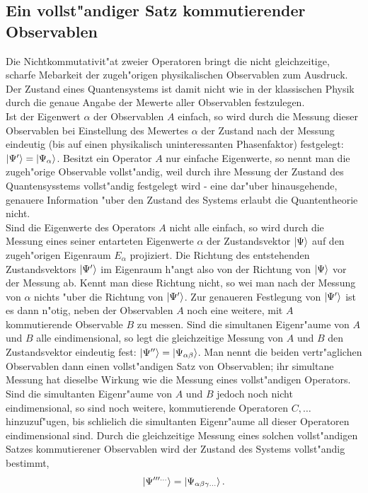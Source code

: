      \subsection{Ein vollst"andiger Satz kommutierender Observablen}
         Die Nichtkommutativit"at zweier Operatoren bringt die nicht gleichzeitige, scharfe Me\3barkeit der zugeh"origen physikalischen Observablen zum Ausdruck. Der
         Zustand eines Quantensystems ist damit nicht wie in der klassischen Physik durch die genaue Angabe der Me\3werte aller Observablen festzulegen. \\
         Ist der Eigenwert $\alpha$ der Observablen $A$ einfach, so wird durch die Messung dieser Observablen bei Einstellung des Me\3wertes $\alpha$ der 
         Zustand nach der Messung eindeutig (bis auf einen physikalisch uninteressanten Phasenfaktor) festgelegt: $\left| \Psi' \right> = \left| \Psi_{\alpha} \right>$. Besitzt ein 
         Operator $A$ nur einfache 
         Eigenwerte, so nennt man die zugeh"orige Observable vollst"andig, weil durch ihre Messung der Zustand des Quantensysstems vollst"andig festgelegt wird - 
         eine dar"uber hinausgehende, genauere Information "uber den Zustand des Systems erlaubt die Quantentheorie nicht. \\
         Sind die Eigenwerte des Operators $A$ nicht alle einfach, so wird durch die Messung eines seiner entarteten Eigenwerte $\alpha$ der Zustandsvektor
         $\left| \Psi \right>$ auf den zugeh"origen Eigenraum $E_{\alpha}$ projiziert. Die Richtung des entstehenden Zustandsvektors $\left| \Psi' \right>$ im Eigenraum h"angt also
         von der Richtung von $\left| \Psi \right>$ vor der Messung ab. Kennt man diese Richtung nicht, so wei\3 man nach der Messung von $\alpha$ nichts "uber die Richtung
         von $\left| \Psi' \right>$. Zur genaueren Festlegung von $\left| \Psi' \right>$ ist es dann n"otig, neben der Observablen $A$ noch
         eine weitere, mit $A$ kommutierende Observable $B$ zu messen. Sind die simultanen Eigenr"aume von $A$ und $B$ alle eindimensional, so legt die gleichzeitige
         Messung von $A$ und $B$ den Zustandsvektor eindeutig fest: $\left| \Psi'' \right> = \left| \Psi_{\alpha\beta} \right>$. Man nennt die beiden vertr"aglichen Observablen dann einen
         vollst"andigen Satz von Observablen; ihr simultane Messung hat dieselbe Wirkung wie die Messung eines vollst"andigen Operators. \\
         Sind die simultanten Eigenr"aume von $A$ und $B$ jedoch noch nicht eindimensional, so sind noch weitere, kommutierende Operatoren $C,\ldots$ hinzuzuf"ugen,
         bis schlie\3lich die simultanten Eigenr"aume all dieser Operatoren eindimensional sind. Durch die gleichzeitige Messung eines solchen vollst"andigen Satzes
         kommutierener Observablen wird der Zustand des Systems vollst"andig bestimmt,
         $$ \left| \Psi'''^{\dots} \right> = \left| \Psi_{\alpha\beta\gamma\ldots} \right>. $$ 
         
